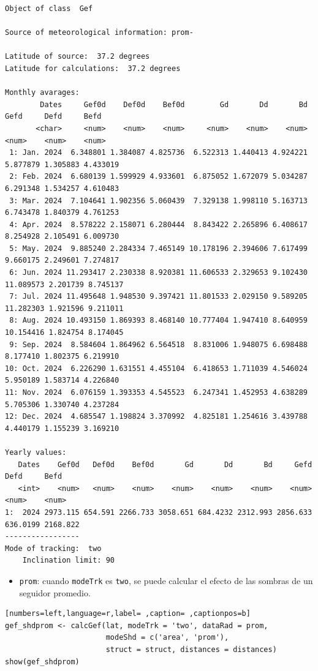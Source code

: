 \begin{verbatim}
Object of class  Gef 

Source of meteorological information: prom- 

Latitude of source:  37.2 degrees
Latitude for calculations:  37.2 degrees

Monthly avarages:
        Dates     Gef0d    Def0d    Bef0d        Gd       Dd       Bd      Gefd     Defd     Befd
       <char>     <num>    <num>    <num>     <num>    <num>    <num>     <num>    <num>    <num>
 1: Jan. 2024  6.348801 1.384087 4.825736  6.522313 1.440413 4.924221  5.877879 1.305883 4.433019
 2: Feb. 2024  6.680139 1.599929 4.933601  6.875052 1.672079 5.034287  6.291348 1.534257 4.610483
 3: Mar. 2024  7.104641 1.902356 5.060439  7.329138 1.998110 5.163713  6.743478 1.840379 4.761253
 4: Apr. 2024  8.578222 2.158071 6.280444  8.843422 2.265896 6.408617  8.254928 2.105491 6.009730
 5: May. 2024  9.885240 2.284334 7.465149 10.178196 2.394606 7.617499  9.660175 2.249601 7.274817
 6: Jun. 2024 11.293417 2.230338 8.920381 11.606533 2.329653 9.102430 11.089573 2.201739 8.745137
 7: Jul. 2024 11.495648 1.948530 9.397421 11.801533 2.029150 9.589205 11.282303 1.921596 9.211011
 8: Aug. 2024 10.493150 1.869393 8.468140 10.777404 1.947410 8.640959 10.154416 1.824754 8.174045
 9: Sep. 2024  8.584604 1.864962 6.564518  8.831006 1.948075 6.698488  8.177410 1.802375 6.219910
10: Oct. 2024  6.226290 1.631551 4.455104  6.418653 1.711039 4.546024  5.950189 1.583714 4.226840
11: Nov. 2024  6.076159 1.393353 4.545523  6.247341 1.452953 4.638289  5.705306 1.330740 4.237284
12: Dec. 2024  4.685547 1.198824 3.370992  4.825181 1.254616 3.439788  4.440179 1.155239 3.169210

Yearly values:
   Dates    Gef0d   Def0d    Bef0d       Gd       Dd       Bd     Gefd     Defd     Befd
   <int>    <num>   <num>    <num>    <num>    <num>    <num>    <num>    <num>    <num>
1:  2024 2973.115 654.591 2266.733 3058.651 684.4232 2312.993 2856.633 636.0199 2168.822
-----------------
Mode of tracking:  two 
    Inclination limit: 90
\end{verbatim}

\begin{itemize}
\item \texttt{prom}: cuando \texttt{modeTrk} es \texttt{two}, se puede calcular el efecto de las sombras de un seguidor promedio.
\end{itemize}
\begin{lstlisting}[numbers=left,language=r,label= ,caption= ,captionpos=b]
gef_shdprom <- calcGef(lat, modeTrk = 'two', dataRad = prom,
                       modeShd = c('area', 'prom'),
                       struct = struct, distances = distances)
show(gef_shdprom)
\end{lstlisting}

